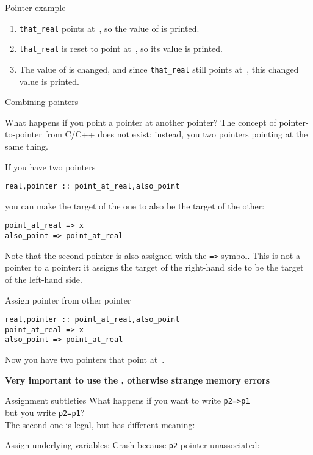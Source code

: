\begin{block}{Pointer example}
  \label{sl:fpoint-ex}
  \begin{enumerate}
  \item \lstinline+that_real+ points at~, so the value of  is printed.
  \item \lstinline+that_real+ is reset to point at~, so its value is printed.
  \item The value of  is changed,
    and since \lstinline+that_real+ still
    points at~, this changed value is printed.
  \end{enumerate}
\end{block}

 {Combining pointers}

What happens if you point a pointer at another pointer?
The concept of pointer-to-pointer from C/C++ does not exist:
instead, you two pointers pointing at the same thing.

If you have two pointers
\begin{lstlisting}
real,pointer :: point_at_real,also_point
\end{lstlisting}
you can make the target of the one to also be the target of the other:
\begin{lstlisting}
point_at_real => x
also_point => point_at_real  
\end{lstlisting}
Note that the second pointer is also assigned with the \lstinline+=>+ symbol.
This is not a pointer to a pointer: it assigns the target of the
right-hand side to be the target of the left-hand side.

\begin{slide}{Assign pointer from other pointer}
  \label{sl:fpoint-copy}
\begin{lstlisting}
real,pointer :: point_at_real,also_point
point_at_real => x
also_point => point_at_real  
\end{lstlisting}
  Now you have two pointers that point at~.

  \textbf{Very important to use the \n{=>}, otherwise strange
    memory errors}
\end{slide}

\begin{block}{Assignment subtleties}
  \label{sl:fpointassign}
  What happens if you want to write \lstinline+p2=>p1+\\
  but you write \lstinline+p2=p1+?\\
  The second one is legal, but has different meaning:
  \begin{multicols}{2}
    Assign underlying variables:
    \columnbreak
    Crash because \lstinline{p2} pointer unassociated:
  \end{multicols}
\end{block}

